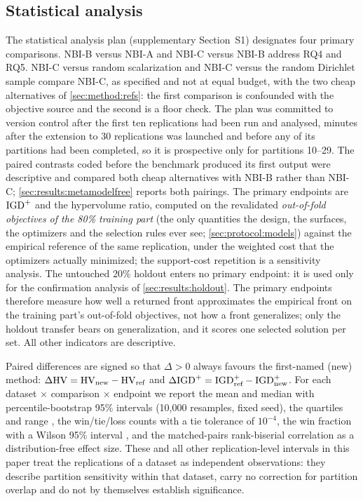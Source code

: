 \subsection{Statistical analysis}
\label{sec:protocol:stats}

The statistical analysis plan (supplementary Section~S1) designates four primary comparisons. NBI-B versus NBI-A and
NBI-C versus NBI-B address RQ4 and RQ5. NBI-C versus random scalarization and NBI-C versus the random Dirichlet sample
compare NBI-C, as specified and not at equal budget, with the two cheap alternatives of \cref{sec:method:refs}: the
first comparison is confounded with the objective source and the second is a floor check. The plan was committed to
version control after the first ten replications had been run and analysed, minutes after the extension to 30
replications was launched and before any of its partitions had been completed, so it is prospective only for
partitions 10--29. The paired contrasts coded before the benchmark produced its first output were descriptive and
compared both cheap alternatives with NBI-B rather than NBI-C; \cref{sec:results:metamodelfree} reports both
pairings. The
primary endpoints are $\mathrm{IGD}^{+}$ and the hypervolume ratio, computed on the revalidated \emph{out-of-fold objectives of
the 80\% training part} (the only quantities the design, the surfaces, the optimizers and the selection rules ever
see; \cref{sec:protocol:models}) against the empirical reference of the same replication, under the weighted cost
that the optimizers actually minimized; the support-cost repetition is a sensitivity analysis. The
untouched 20\% holdout enters no primary endpoint: it is used only for the confirmation analysis of
\cref{sec:results:holdout}. The primary endpoints therefore measure how well a returned front approximates the
empirical front on the training part's out-of-fold objectives, not how a front generalizes; only the holdout
transfer bears on generalization, and it scores one selected solution per set. All other indicators are descriptive.

Paired differences are signed so that $\Delta > 0$ always favours the first-named (new) method:
$\Delta\mathrm{HV} = \mathrm{HV}_{\text{new}} - \mathrm{HV}_{\text{ref}}$ and
$\Delta\mathrm{IGD}^{+} = \mathrm{IGD}^{+}_{\text{ref}} - \mathrm{IGD}^{+}_{\text{new}}$. For each dataset $\times$ comparison $\times$ endpoint we
report the mean and median with percentile-bootstrap 95\% intervals (10{,}000 resamples, fixed seed), the quartiles
and range \citep{efron1993bootstrap}, the win/tie/loss counts with a tie tolerance of $10^{-4}$, the win fraction
with a Wilson 95\% interval \citep{wilson1927probable}, and the matched-pairs rank-biserial correlation
\citep{kerby2014simple} as a distribution-free effect size. These and all other replication-level intervals in this
paper treat the replications of a dataset as independent observations: they describe partition sensitivity within
that dataset, carry no correction for partition overlap and do not by themselves establish significance.

